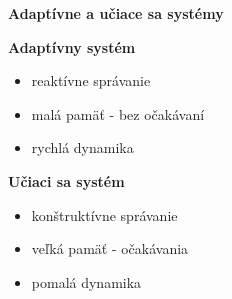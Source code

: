 \documentclass[xcolor=dvipsnames]{beamer}
\begin{document}
\begin{frame}{\bf Adaptívne a učiace sa systémy}

\begin{minipage}{.5\textwidth}
  {\bf Adaptívny systém}

  \begin{itemize}
  \item reaktívne správanie
  \item malá pamäť - bez očakávaní
  \item rychlá dynamika
  \end{itemize}

\end{minipage}%
\begin{minipage}{.5\textwidth}
  {\bf Učiaci sa systém}

  \begin{itemize}
  \item konštruktívne správanie
  \item veľká pamäť - očakávania
  \item pomalá dynamika
  \end{itemize}

\end{minipage}
\end{frame}
\end{document}
